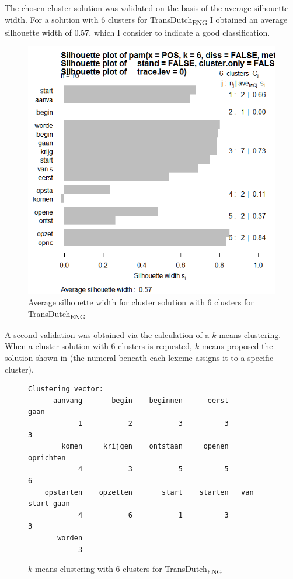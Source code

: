 The chosen cluster solution was validated on the basis of the average silhouette width. For a solution with 6 clusters for TransDutch\textsubscript{ENG} I obtained an average silhouette width of 0.57, which I consider to indicate a good classification.

\begin{figure}
\includegraphics[height=.4\textheight]{figures/Vandevoorde2-img66.png}
\caption{\label{fig:4:65}Average silhouette width for cluster solution with 6 clusters for TransDutch\textsubscript{ENG}}
\end{figure}

A second validation was obtained via the calculation of a $k$-means clustering. When a cluster solution with 6 clusters is requested, $k$-means proposed the solution shown in  (the numeral beneath each lexeme assigns it to a specific cluster).

\begin{figure}
\begin{lstlisting}
Clustering vector:
      aanvang       begin    beginnen      eerst             gaan 
            1           2           3          3                3         
        komen     krijgen    ontstaan     openen        oprichten         
            4           3           5          5                6         
    opstarten    opzetten       start    starten   van start gaan         
            4           6           1          3                3         
       worden                                            
            3                                      
\end{lstlisting}
\caption{\label{fig:4:66}$k$-means clustering with 6 clusters for TransDutch\textsubscript{ENG}}
\end{figure}

